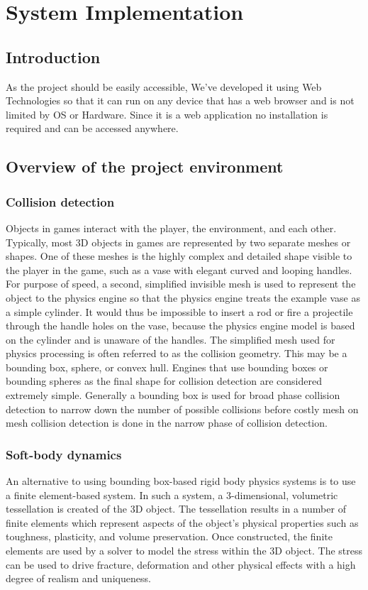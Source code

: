 \documentclass[BTech]{srmuthesis}
\begin{document}
\chapter{System Implementation}
\section{Introduction}
As the project should be easily accessible, We've developed it using Web Technologies so that it can run on any device that has a web browser and is not limited by OS or Hardware.
Since it is a web application no installation is required and can be accessed anywhere.
\section{Overview of the project environment}
\subsection{Collision detection}
Objects in games interact with the player, the environment, and each other. Typically, most 3D objects in games are represented by two separate meshes or shapes. One of these meshes is the highly complex and detailed shape visible to the player in the game, such as a vase with elegant curved and looping handles. For purpose of speed, a second, simplified invisible mesh is used to represent the object to the physics engine so that the physics engine treats the example vase as a simple cylinder. It would thus be impossible to insert a rod or fire a projectile through the handle holes on the vase, because the physics engine model is based on the cylinder and is unaware of the handles. The simplified mesh used for physics processing is often referred to as the collision geometry. This may be a bounding box, sphere, or convex hull. Engines that use bounding boxes or bounding spheres as the final shape for collision detection are considered extremely simple. Generally a bounding box is used for broad phase collision detection to narrow down the number of possible collisions before costly mesh on mesh collision detection is done in the narrow phase of collision detection.
\subsection{Soft-body dynamics}
An alternative to using bounding box-based rigid body physics systems is to use a finite element-based system. In such a system, a 3-dimensional, volumetric tessellation is created of the 3D object. The tessellation results in a number of finite elements which represent aspects of the object's physical properties such as toughness, plasticity, and volume preservation. Once constructed, the finite elements are used by a solver to model the stress within the 3D object. The stress can be used to drive fracture, deformation and other physical effects with a high degree of realism and uniqueness.
\end{document}
